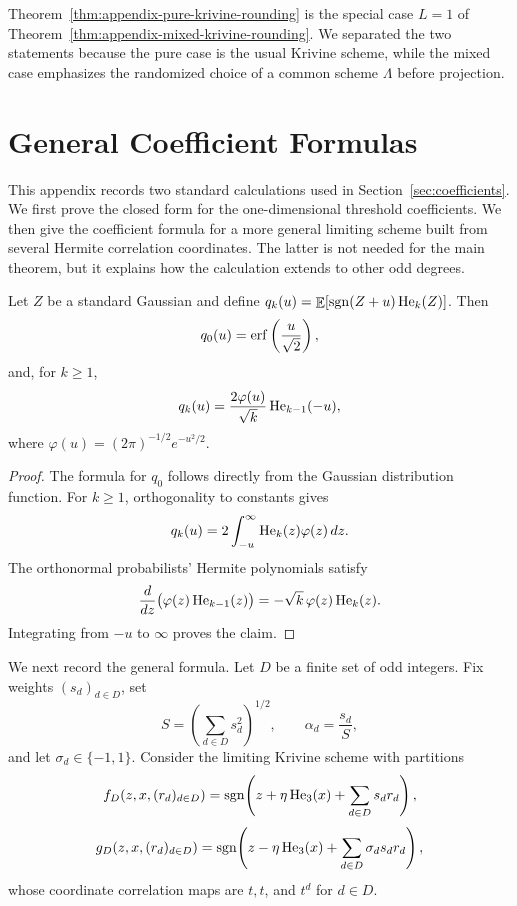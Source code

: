 \begin{remark}
Theorem~\ref{thm:appendix-pure-krivine-rounding} is the special case
\(L=1\) of Theorem~\ref{thm:appendix-mixed-krivine-rounding}. We separated
the two statements because the pure case is the usual Krivine scheme, while
the mixed case emphasizes the randomized choice of a common scheme
\(\Lambda\) before projection.
\end{remark}


\section{General Coefficient Formulas}
\label{app:coefficient-formulas}

This appendix records two standard calculations used in
Section~\ref{sec:coefficients}. We first prove the closed form for the
one-dimensional threshold coefficients. We then give the coefficient
formula for a more general limiting scheme built from several Hermite
correlation coordinates. The latter is not needed for the main theorem,
but it explains how the calculation extends to other odd degrees.

\begin{lemma}
\label{lem:qk}
Let \(Z\) be a standard Gaussian and define
\(
q_k(u)=\mathop{\mathbb{E}}[\operatorname{sgn}(Z+u)\operatorname{He}_k(Z)]
\).
Then
\[
    q_0(u)
    =
    \operatorname{erf}\left(\frac{u}{\sqrt{2}}\right),
\]
and, for \(k\geq 1\),
\[
    q_k(u)
    =
    \frac{2\varphi(u)}{\sqrt{k}}\operatorname{He}_{k-1}(-u),
\]
where \(\varphi(u)=(2\pi)^{-1/2}e^{-u^2/2}\).
\end{lemma}

\begin{proof}
The formula for \(q_0\) follows directly from the Gaussian distribution
function. For \(k\geq 1\), orthogonality to constants gives
\[
    q_k(u)
    =
    2\int_{-u}^{\infty}\operatorname{He}_k(z)\varphi(z)\,dz.
\]
The orthonormal probabilists' Hermite polynomials satisfy
\[
    \frac{d}{dz}
    \bigl(\varphi(z)\operatorname{He}_{k-1}(z)\bigr)
    =
    -\sqrt{k}\,\varphi(z)\operatorname{He}_k(z).
\]
Integrating from \(-u\) to \(\infty\) proves the claim.
\end{proof}

We next record the general formula. Let \(D\) be a finite set of odd
integers. Fix weights \((s_d)_{d\in D}\), set
\[
    S
    =
    \left(\sum_{d\in D}s_d^2\right)^{1/2},
    \qquad
    \alpha_d
    =
    \frac{s_d}{S},
\]
and let \(\sigma_d\in\{-1,1\}\). Consider the limiting Krivine scheme
with partitions
\[
    f_D(z,x,(r_d)_{d\in D})
    =
    \operatorname{sgn}\!\left(
        z+\eta\operatorname{He}_3(x)+\sum_{d\in D}s_dr_d
    \right),
\]
\[
    g_D(z,x,(r_d)_{d\in D})
    =
    \operatorname{sgn}\!\left(
        z-\eta\operatorname{He}_3(x)+\sum_{d\in D}\sigma_ds_dr_d
    \right),
\]
whose coordinate correlation maps are \(t,t\), and \(t^d\) for
\(d\in D\).

